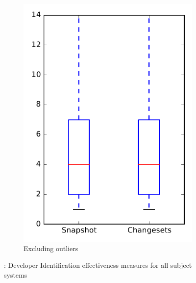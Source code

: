 \begin{figure}
\begin{subfigure}{.4\textwidth}
        \includegraphics[height=0.4\textheight]{figures/dit/rq1_overview_no_outlier}
        \caption{Excluding outliers}\label{fig:dit:rq1:overview_no_outlier}
    \end{subfigure}
\caption{\done: Developer Identification effectiveness measures for all subject systems}
\label{fig:dit:rq1:overview}
\end{figure}
